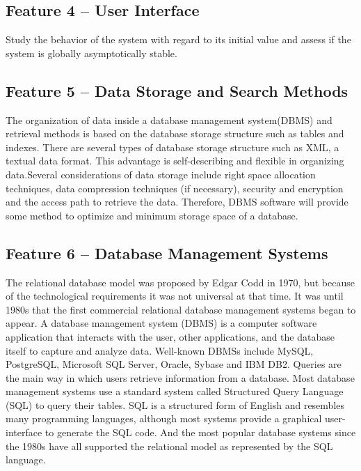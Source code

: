 \documentclass[a4paper]{article} %
\begin{document}
\subsection*{Feature 4 -- User Interface}
\label{task1:feature4}

Study the behavior of the system with regard to its initial value and assess if the system is globally asymptotically stable.

\subsection*{Feature 5 -- Data Storage and Search Methods}
\label{task1:feature5}

The organization of data inside a database management system(DBMS) and retrieval methods is based on the database storage structure such as tables and indexes. 
There are several types of database storage structure such as XML, a textual data format. 
This advantage is self-describing and flexible in organizing data.\cite{ISI:000253400700005}Several considerations of data storage include right space allocation techniques, data compression techniques (if necessary), security and encryption and the access path to retrieve the data. 
Therefore, DBMS software will provide some method to optimize and  minimum storage space of a database.

\subsection*{Feature 6 -- Database Management Systems}
\label{task1:feature6}

The relational database model was proposed by Edgar Codd in 1970, but because of the technological requirements it was not universal at that time. It was until 1980s that the first commercial relational database management systems began to appear. 
A database management system (DBMS) is a computer software application that interacts with the user, other applications, and the database itself to capture and analyze data. Well-known DBMSs include MySQL, PostgreSQL, Microsoft SQL Server, Oracle, Sybase and IBM DB2. 
Queries are the main way in which users retrieve information from a database. Most database management systems use a standard system called Structured Query Language (SQL) to query their tables. SQL is a structured form of English and resembles many programming languages, although most systems provide a graphical user-interface to generate the SQL code. And the most popular database systems since the 1980s have all supported the relational model as represented by the SQL language.\cite{Martinez-Cruz2011}
\end{document}

